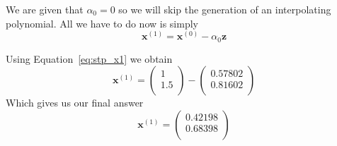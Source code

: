 \documentclass[12pt]{article}
\begin{document}
% 
% 
% 
% 
% 

We are given that $\alpha_0=0$ so we will skip the generation of an
interpolating polynomial. All we have to do now is simply
\begin{equation}
  \label{eq:stp_x1}
  \mathbf{x}^{(1)}=\mathbf{x}^{(0)}-\alpha_0\mathbf{z}
\end{equation}

Using Equation~\ref{eq:stp_x1} we obtain
\begin{equation*}
  \label{eq:stp_x1_numeric}
  \mathbf{x}^{(1)}=
  \begin{pmatrix}
    1 \\
    1.5 \\
  \end{pmatrix} - 
  \begin{pmatrix}
    0.57802 \\
    0.81602 \\
  \end{pmatrix}  
\end{equation*}
Which gives us our final answer
\begin{equation*}
\label{eq:stp_x1_answer}
\boxed{\mathbf{x}^{(1)}=
  \begin{pmatrix}
    0.42198 \\
    0.68398 \\
  \end{pmatrix}}
\end{equation*}
\end{document}
